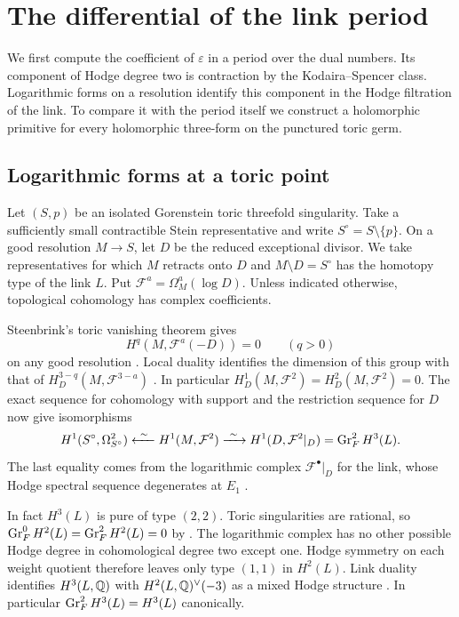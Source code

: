 \section{The differential of the link period}\label{sec:hodge}

We first compute the coefficient of $\varepsilon$ in a period over the
dual numbers. Its component of Hodge degree two is contraction by the
Kodaira--Spencer class. Logarithmic forms on a resolution identify
this component in the Hodge
filtration of the link. To compare it with the period itself we construct
a holomorphic primitive for every holomorphic three-form on the punctured
toric germ.

\subsection{Logarithmic forms at a toric point}
Let $(S,p)$ be an isolated Gorenstein toric threefold singularity. Take
a sufficiently small contractible Stein representative and write
$S^\circ=S\setminus\{p\}$. On a good resolution $M\to S$, let $D$ be
the reduced exceptional divisor. We take representatives for which $M$
retracts onto $D$ and $M\setminus D=S^\circ$ has the homotopy type of
the link $L$. Put $\mathcal F^a=\Omega_M^a(\log D)$. Unless indicated
otherwise, topological cohomology has complex coefficients.

Steenbrink's toric vanishing theorem gives
\begin{equation}\label{hg:vanishing}
 H^q(M,\mathcal F^a(-D))=0\qquad (q>0)
\end{equation}
on any good resolution \cite[\S2, Theorem~2]{Ste}. Local duality
identifies the dimension of this group with that of
$H_D^{3-q}(M,\mathcal F^{3-a})$ \cite[Definition~1.4]{FL}.
In particular $H^1_D(M,\mathcal F^2)=H^2_D(M,\mathcal F^2)=0$.
The exact sequence for cohomology with support and the restriction
sequence for $D$ now give isomorphisms
\begin{equation}\label{hg:restrictions}
 H^1(S^\circ,\Omega^2_{S^\circ})
 \xleftarrow{\ \sim\ } H^1(M,\mathcal F^2)
 \xrightarrow{\ \sim\ } H^1(D,\mathcal F^2|_D)
 =\operatorname{Gr}_F^2 H^3(L).
\end{equation}
The last equality comes from the logarithmic complex
$\mathcal F^\bullet|_D$ for the link, whose Hodge spectral sequence
degenerates at $E_1$ \cite[\S3]{Ste}.

In fact $H^3(L)$ is pure of type $(2,2)$. Toric singularities are
rational, so $\operatorname{Gr}_F^0H^2(L)=\operatorname{Gr}_F^2H^2(L)=0$ by
\cite[\S3, Lemma~2]{Ste}. The logarithmic complex has no other
possible Hodge degree in cohomological degree two except one.
Hodge symmetry on each weight quotient therefore leaves only type
$(1,1)$ in $H^2(L)$. Link duality identifies $H^3(L,\mathbb Q)$ with
$H^2(L,\mathbb Q)^\vee(-3)$ as a mixed Hodge structure \cite[\S3]{Ste}.
In particular $\operatorname{Gr}_F^2H^3(L)=H^3(L)$ canonically.

